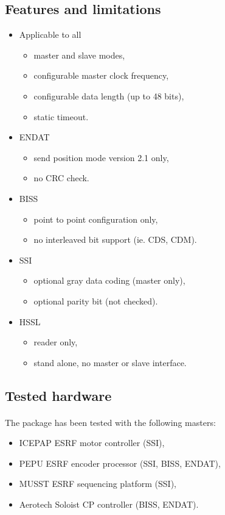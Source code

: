 \documentclass[12pt]{article}
\begin{document}
\subsection{Features and limitations}
\begin{itemize}
\item Applicable to all
  \begin{itemize}
  \item master and slave modes,
  \item configurable master clock frequency,
  \item configurable data length (up to 48 bits),
  \item static timeout.
  \end{itemize}
\item ENDAT
  \begin{itemize}
  \item send position mode version 2.1 only,
  \item no CRC check.
  \end{itemize}
\item BISS
  \begin{itemize}
  \item point to point configuration only,
  \item no interleaved bit support (ie. CDS, CDM).
  \end{itemize}
\item SSI
   \begin{itemize}
   \item optional gray data coding (master only),
   \item optional parity bit (not checked).
   \end{itemize}
\item HSSL
   \begin{itemize}
   \item reader only,
   \item stand alone, no master or slave interface.
   \end{itemize}
\end{itemize}


\subsection{Tested hardware}
\paragraph{}
The package has been tested with the following masters:
\begin{itemize}
  \item ICEPAP ESRF motor controller (SSI),
  \item PEPU ESRF encoder processor (SSI, BISS, ENDAT),
  \item MUSST ESRF sequencing platform (SSI),
  \item Aerotech Soloist CP controller (BISS, ENDAT).
\end{itemize}
\end{document}
